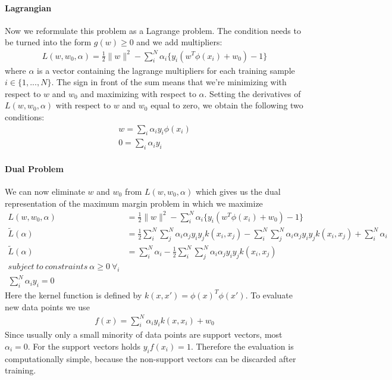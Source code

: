 \documentclass[main]{subfiles}
\begin{document}
\paragraph{Lagrangian}
Now we reformulate this problem as a Lagrange problem. The condition needs to be turned into the form $g(w) \geq 0$ and we add multipliers:
\begin{align}
L(w,w_0,\alpha)=\frac{1}{2}\parallel w \parallel^2 - \sum_i^N \alpha_i \{y_i (w^T\phi(x_i) + w_0) - 1\}
\end{align}
where $\alpha$ is a vector containing the lagrange multipliers for each training sample $i \in \{1, ... ,N\}$. The sign in front of the sum means that we're minimizing with respect to $w$ and $w_0$ and maximizing with respect to $\alpha$. Setting the derivatives of $L(w,w_0,\alpha)$ with respect to $w$ and $w_0$ equal to zero, we obtain the following two conditions:
\begin{align}
w = \sum_i \alpha_i y_i \phi(x_i) \\
0 = \sum_i \alpha_i y_i
\end{align}
\paragraph{Dual Problem}
We can now eliminate $w$ and $w_0$ from $L(w,w_0,\alpha)$ which gives us the dual representation of the maximum margin problem in which we maximize
\begin{align}
L(w,w_0,\alpha)&=\frac{1}{2}\parallel w \parallel^2 - \sum_i^N \alpha_i \{y_i (w^T\phi(x_i) + w_0) - 1\} \\
\tilde{L}(\alpha)&=\frac{1}{2} \sum_i^N \sum_j^N \alpha_i \alpha_j y_i y_j k(x_i, x_j) - \sum_i^N \sum_j^N \alpha_i \alpha_j y_i y_j k(x_i, x_j) + \sum_i^N \alpha_i \\
\tilde{L}(\alpha)&=\sum_i^N \alpha_i - \frac{1}{2} \sum_i^N \sum_j^N \alpha_i \alpha_j y_i y_j k(x_i, x_j) \\
subject \ to \ constraints \ \alpha  \geq 0 \ \forall_i \\
\sum_i^N \alpha_i y_i = 0
\end{align}
Here the kernel function is defined by $k(x, x')=\phi(x)^T \phi(x')$.
To evaluate new data points we use
\begin{align}
f(x)=\sum_i^N \alpha_i y_i k(x, x_i) + w_0
\end{align}
Since usually only a small minority of data points are support vectors, most $\alpha_i=0$. For the support vectors holds $y_if(x_i) = 1$. Therefore the evaluation is computationally simple, because the non-support vectors can be discarded after training. \newline
\end{document}
